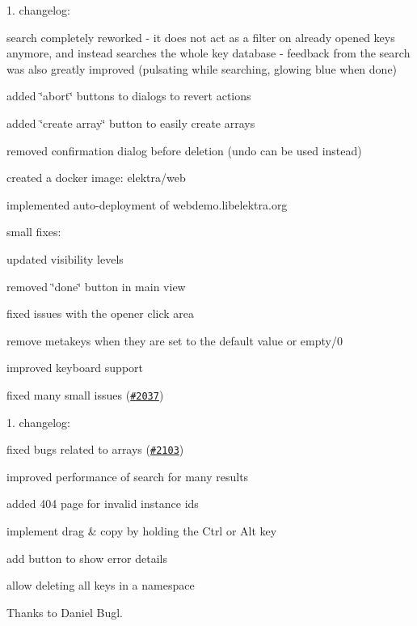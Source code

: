 1. changelog\+:


\begin{DoxyItemize}
\item search completely reworked -\/ it does not act as a filter on already opened keys anymore, and instead searches the whole key database -\/ feedback from the search was also greatly improved (pulsating while searching, glowing blue when done)
\item added \char`\"{}abort\char`\"{} buttons to dialogs to revert actions
\item added \char`\"{}create array\char`\"{} button to easily create arrays
\item removed confirmation dialog before deletion (undo can be used instead)
\item created a docker image\+: {\ttfamily elektra/web}
\item implemented auto-\/deployment of webdemo.\+libelektra.\+org
\item small fixes\+:
\begin{DoxyItemize}
\item updated visibility levels
\item removed \char`\"{}done\char`\"{} button in main view
\item fixed issues with the opener click area
\item remove metakeys when they are set to the default value or empty/0
\item improved keyboard support
\item fixed many small issues (\href{https://issues.libelektra.org/2037}{\tt \#2037})
\end{DoxyItemize}
\end{DoxyItemize}

1. changelog\+:


\begin{DoxyItemize}
\item fixed bugs related to arrays (\href{https://issues.libelektra.org/2103}{\tt \#2103})
\item improved performance of search for many results
\item added 404 page for invalid instance ids
\item implement drag \& copy by holding the Ctrl or Alt key
\item add button to show error details
\item allow deleting all keys in a namespace
\end{DoxyItemize}

Thanks to Daniel Bugl.

